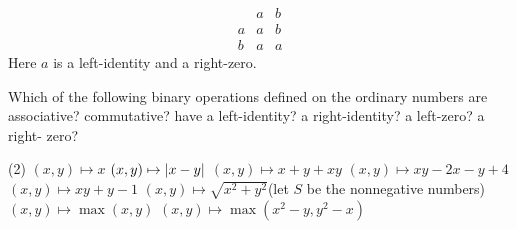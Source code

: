\begin{solution}
\begin{enumalpha}
    \item
    \[\begin{array}{c|cc}
          & a & b\\
        \hline
        a & a & b\\
        b & a & a
    \end{array}\]
    Here $a$ is a left-identity and a right-zero.
\end{enumalpha}
\end{solution}

\begin{exercise}
Which of the following binary operations defined on the ordinary numbers are
associative? commutative? have a left-identity? a right-identity? a left-zero? a right-
zero?
\begin{tasks}[label=(\alph*),label-width=1.4em](2)
    \task $(x,y)\mapsto x$
    \task $(x,y)\mapsto \left\lvert x-y\right\rvert$
    \task $(x,y)\mapsto x+y+xy$
    \task $(x,y)\mapsto xy-2x-y+4$
    \task $(x,y)\mapsto xy+y-1$
    \task $(x,y)\mapsto \sqrt{x^2+y^2}$\quad (let $S$ be the nonnegative numbers)
    \task $(x,y)\mapsto \max(x,y)$
    \task $(x,y)\mapsto \max(x^2-y,y^2-x)$
\end{tasks}
\end{exercise}

